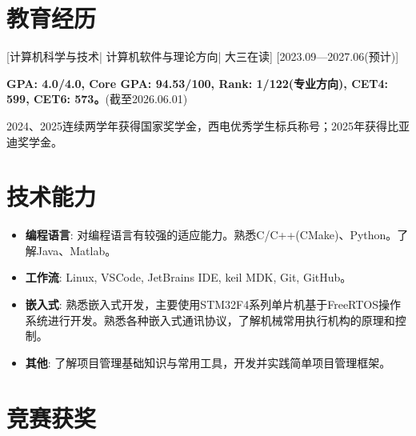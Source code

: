 \documentclass{resume}
\begin{document}


\ResumeTitle

\section{教育经历}
[\textnormal{计算机科学与技术| 计算机软件与理论方向| 大三在读}]
[2023.09—2027.06(预计)]

\textbf{GPA: 4.0/4.0, Core GPA: 94.53/100, Rank: 1/122(专业方向), CET4: 599, CET6: 573。}(截至2026.06.01)

2024、2025连续两学年获得国家奖学金，西电优秀学生标兵称号；2025年获得比亚迪奖学金。

\section[技术能力]{技术能力}
\begin{itemize}
  \item \textbf{编程语言}: 对编程语言有较强的适应能力。熟悉C/C++(CMake)、Python。了解Java、Matlab。
  \item \textbf{工作流}: Linux, VSCode, JetBrains IDE, keil MDK, Git, GitHub。
  \item \textbf{嵌入式}: 熟悉嵌入式开发，主要使用STM32F4系列单片机基于FreeRTOS操作系统进行开发。熟悉各种嵌入式通讯协议，了解机械常用执行机构的原理和控制。
  \item \textbf{其他}: 了解项目管理基础知识与常用工具，开发并实践简单项目管理框架。
\end{itemize}

\section{竞赛获奖}
\end{document}
